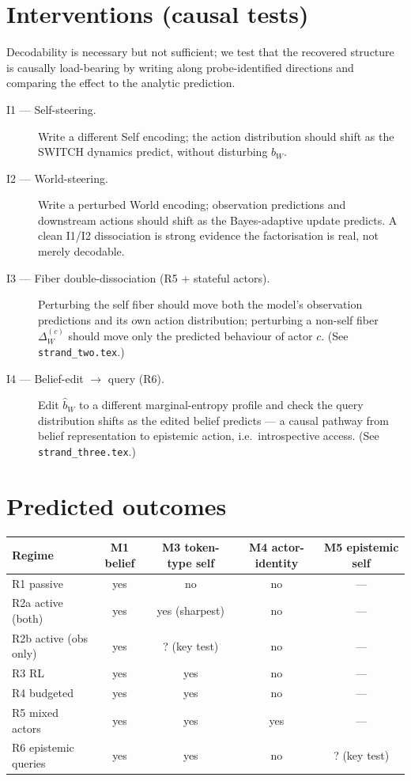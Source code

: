 \documentclass[11pt]{article}
\begin{document}
\section{Interventions (causal tests)}
\label{sec:intervene}

Decodability is necessary but not sufficient; we test that the recovered
structure is causally load-bearing by writing along probe-identified directions
and comparing the effect to the analytic prediction.

\begin{description}
  \item[I1 --- Self-steering.] Write a different Self encoding; the action
  distribution should shift as the SWITCH dynamics predict, without disturbing
  $b_W$.
  \item[I2 --- World-steering.] Write a perturbed World encoding; observation
  predictions and downstream actions should shift as the Bayes-adaptive update
  predicts. A clean I1/I2 dissociation is strong evidence the factorisation is
  real, not merely decodable.
  \item[I3 --- Fiber double-dissociation (R5 + stateful actors).] Perturbing the
  self fiber should move both the model's observation predictions and its own
  action distribution; perturbing a non-self fiber $\Delta_W^{(c)}$ should move
  only the predicted behaviour of actor $c$. (See \texttt{strand\_two.tex}.)
  \item[I4 --- Belief-edit $\to$ query (R6).] Edit $\hat b_W$ to a different
  marginal-entropy profile and check the query distribution shifts as the edited
  belief predicts --- a causal pathway from belief representation to epistemic
  action, i.e.\ introspective access. (See \texttt{strand\_three.tex}.)
\end{description}

\section{Predicted outcomes}

\begin{center}
\small
\begin{tabular}{lcccc}
\toprule
Regime & M1 belief & M3 token-type self & M4 actor-identity & M5 epistemic self \\
\midrule
R1 passive            & yes & no            & no  & --- \\
R2a active (both)     & yes & yes (sharpest)& no  & --- \\
R2b active (obs only) & yes & ? (key test)  & no  & --- \\
R3 RL                 & yes & yes           & no  & --- \\
R4 budgeted           & yes & yes           & no  & --- \\
R5 mixed actors       & yes & yes           & yes & --- \\
R6 epistemic queries  & yes & yes           & no  & ? (key test) \\
\bottomrule
\end{tabular}
\end{center}
\end{document}
